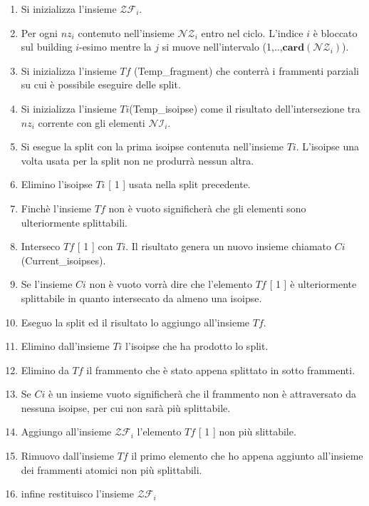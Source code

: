 \begin{enumerate}
	\item Si inizializza l'insieme $\mathcal{ZF}_i$.
	\item Per ogni $nz_i$ contenuto nell'insieme $\mathcal{NZ}_i$ entro nel ciclo. L'indice $i$ è bloccato sul building $i$-esimo mentre la $j$ si muove nell'intervalo (1,..,$\mathbf{card}(\mathcal{NZ}_i)$).
	\item Si inizializza l'insieme $Tf$ (Temp\_fragment) che conterrà i frammenti parziali su cui è possibile eseguire delle split.
	\item Si inizializza l'insieme $Ti$(Temp\_isoipse) come il risultato dell'intersezione tra $nz_i$ corrente con gli elementi $\mathcal{NI}_i$. 
	\item Si esegue la split con la prima isoipse contenuta nell'insieme $Ti$. L'isoipse una volta usata per la split non ne produrrà nessun altra.
	\item Elimino l'isoipse $Ti$ [ 1 ] usata nella split precedente.
	\item Finchè l'insieme $Tf$ non è vuoto significherà che gli elementi sono ulteriormente splittabili.
	\item Interseco $Tf$ [ 1 ] con $Ti$. Il risultato genera un nuovo insieme chiamato $Ci$(Current\_isoipses).
	\item Se l'insieme $Ci$ non è vuoto vorrà dire che l'elemento $Tf$ [ 1 ] è ulteriormente splittabile in quanto intersecato da almeno una isoipse.
	\item Eseguo la split ed il risultato lo aggiungo all'insieme $Tf$.
	\item Elimino dall'insieme $Ti$ l'isoipse che ha prodotto lo split.
	\item Elimino da $Tf$ il frammento che è stato appena splittato in sotto frammenti.
	\item Se $Ci$ è un insieme vuoto significherà che il frammento non è attraversato da nessuna isoipse, per cui non sarà più splittabile.
	\item Aggiungo all'insieme $\mathcal{ZF}_i$ l'elemento $Tf$ [ 1 ] non più slittabile.
	\item Rimuovo dall'insieme $Tf$ il primo elemento che ho appena aggiunto all'insieme dei frammenti atomici non più splittabili.
	\item infine restituisco l'insieme $\mathcal{ZF}_i$
\end{enumerate}

